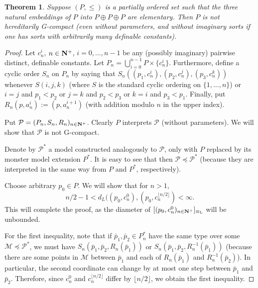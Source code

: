 \documentclass[final,a4paper,12pt]{amsart}
\newcommand\Lasc{{\mathrm{L}}}
\DeclareMathOperator{\Th}{{Th}}
\newtheorem{thm}{Theorem}[section]
\theoremstyle{remark}
\theoremstyle{definition}
\newcounter{claimcounter}[thm]
\newenvironment{clm}{\stepcounter{claimcounter}{\noindent {\textbf{Claim}} \theclaimcounter:}}{}
\newenvironment{clmproof}[1][\proofname]{\proof[#1]\renewcommand{\qedsymbol}{$\square$(claim)}}{\endproof}
\begin{document}
	\begin{thm}
		\label{thm:main_3copies}
		Suppose $(P,\leq)$ is a partially ordered set such that the three natural embeddings of $P$ into $P\oplus P\oplus P$ are elementary. Then $P$ is not hereditarily G-compact (even without parameters, and without imaginary sorts if one has sorts with arbitrarily many definable constants).
	\end{thm}
	\begin{proof}
		Let $c_n^i$, $n\in {\bf N}^+$, $i=0,\ldots,n-1$ be any (possibly imaginary) pairwise distinct, definable constants. Let $P_n=\bigcup_{i=0}^{n-1} P\times \{c_n^i\}$. Furthermore, define a cyclic order $S_n$ on $P_n$ by saying that $S_n((p_1,c_n^i),(p_2,c_n^j),(p_3,c_n^k))$ whenever $S(i,j,k)$ (where $S$ is the standard cyclic ordering on $\{1,\ldots,n\}$) or $i=j$ and $p_1<p_2$ or $j=k$ and $p_2<p_3$ or $k=i$ and $p_3<p_1$. Finally, put $R_n(p,a_n^i):=(p,a_n^{i+1})$ (with addition modulo $n$ in the upper index).
		
		Put $\mathcal P=(P_n,S_n,R_n)_{n\in {\bf N}^+}$. Clearly $P$ interprets $\mathcal P$ (without parameters). We will show that $\mathcal P$ is not G-compact.
		
		Denote by $\mathcal P^*$ a model constructed analogously to $\mathcal P$, only with $P$ replaced by its monster model extension $P^*$. It is easy to see that then $\mathcal P\preceq \mathcal P^*$ (because they are interpreted in the same way from $P$ and $P^*$, respectively).
%		
		
		Choose arbitrary $p_0\in P$. We will show that for $n>1$,
		\[
			n/2-1<d_L((p_0,c_n^0),(p_0,c_n^{\lfloor n/2\rfloor})<\infty.
		\]
		This will complete the proof, as the diameter of $[(p_0,c_n^0)_{n\in {\bf N}^+}]_{\equiv_{\Lasc}}$ will be unbounded.
		
		For the first inequality, note that if $\bar p_1, \bar p_2\in P_n^*$ have the same type over some $\mathcal M\preceq \mathcal P^*$, we must have $S_n(\bar p_1,\bar p_2,R_n(\bar p_1))$ or $S_n(\bar p_1,\bar p_2,R_n^{-1}(\bar p_1))$ (because there are some points in $\mathcal M$ between $\bar p_1$ and each of $R_n(\bar p_1)$ and $R_n^{-1}(\bar p_2)$). In particular, the second coordinate can change by at most one step between $\bar p_1$ and $\bar p_2$. Therefore, since $c_n^0$ and $c_n^{\lfloor n/2\rfloor}$ differ by $\lfloor n/2\rfloor$, we obtain the first inequality.
		

\end{proof}
\end{document}
